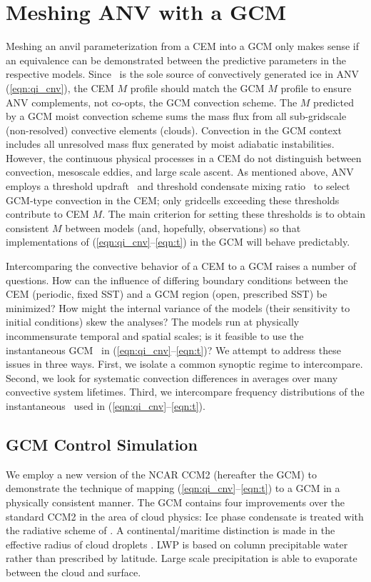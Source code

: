 \documentclass[twoside,agums]{aguplus}
\begin{document}
\section{Meshing ANV with a GCM}\label{sec:gcm}

Meshing an anvil parameterization from a CEM into a GCM only makes
sense if an equivalence can be demonstrated between the predictive
parameters in the respective models.
Since \Mc\ is the sole source of convectively generated ice in ANV
(\ref{eqn:qi_cnv}), the CEM $M$ profile should match the GCM $M$
profile to ensure ANV complements, not co-opts, the GCM convection
scheme.
The $M$ predicted by a GCM moist convection scheme sums the mass flux
from all sub-gridscale (non-resolved) convective elements (clouds).
Convection in the GCM context includes all unresolved mass flux
generated by moist adiabatic instabilities.
However, the continuous physical processes in a CEM do not distinguish 
between convection, mesoscale eddies, and large scale ascent.
As mentioned above, ANV employs a threshold updraft \wc\
and threshold condensate mixing ratio \qcc\ to select GCM-type
convection in the CEM; only gridcells exceeding these thresholds
contribute to CEM $M$.
The main criterion for setting these thresholds is to obtain
consistent $M$ between models (and, hopefully, observations) so that
implementations of (\ref{eqn:qi_cnv}--\ref{eqn:t}) in the GCM will
behave predictably.

Intercomparing the convective behavior of a CEM to a GCM raises a 
number of questions.
How can the influence of differing boundary conditions between the CEM 
(periodic, fixed SST) and a GCM region (open, prescribed SST) be
minimized? 
How might the internal variance of the models (their sensitivity to
initial conditions) skew the analyses?
The models run at physically incommensurate temporal and spatial
scales; is it feasible to use the instantaneous GCM \Mc\ in
(\ref{eqn:qi_cnv}--\ref{eqn:t})?
We attempt to address these issues in three ways.
First, we isolate a common synoptic regime to intercompare.
Second, we look for systematic convection differences in averages over
many convective system lifetimes.
Third, we intercompare frequency distributions of the instantaneous
\Mc\ used in (\ref{eqn:qi_cnv}--\ref{eqn:t}).

\subsection{GCM Control Simulation}

We employ a new version of the NCAR CCM2 (hereafter the GCM) to 
demonstrate the technique of mapping (\ref{eqn:qi_cnv}--\ref{eqn:t})
to a GCM in a physically consistent manner. 
The GCM contains four improvements over the standard CCM2
\cite[]{HBB93} in the area of cloud physics:
Ice phase condensate is treated with the radiative scheme of
\cite[]{EbC92}.
A continental/maritime distinction is made in the effective radius of
cloud droplets \cite[]{Kie942}.
LWP is based on column precipitable water rather than prescribed by
latitude. 
Large scale precipitation is able to evaporate between the cloud and
surface.
\end{document}
